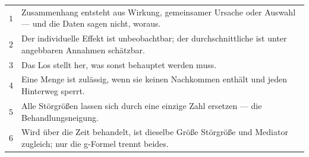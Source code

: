 \begin{merksatz}
\begin{center}
{\small
\renewcommand{\arraystretch}{1.55}
\begin{tabular}{@{}P{0.7cm}P{7.7cm}@{}}
\toprule
$1$ & Zusammenhang entsteht aus Wirkung, gemeinsamer Ursache oder Auswahl --- und die Daten sagen nicht, woraus.\\
$2$ & Der individuelle Effekt ist unbeobachtbar; der durchschnittliche ist unter angebbaren Annahmen schätzbar.\\
$3$ & Das Los stellt her, was sonst behauptet werden muss.\\
$4$ & Eine Menge ist zulässig, wenn sie keinen Nachkommen enthält und jeden Hinterweg sperrt.\\
$5$ & Alle Störgrößen lassen sich durch eine einzige Zahl ersetzen --- die Behandlungsneigung.\\
$6$ & Wird über die Zeit behandelt, ist dieselbe Größe Störgröße und Mediator zugleich; nur die g-Formel trennt beides.\\
\bottomrule
\end{tabular}}
\end{center}
\end{merksatz}


